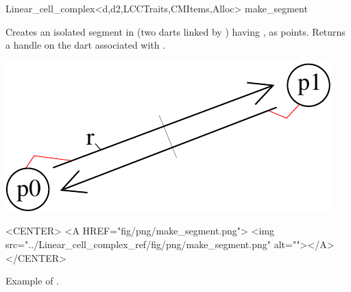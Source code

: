 \begin{ccRefClass}{Linear_cell_complex<d,d2,LCCTraits,CMItems,Alloc>}
{make_segment}{}

{Creates an isolated segment in  (two darts linked by \betadeux{}) 
  having ,  as points.
  Returns a handle on the dart associated with .
}
% 
\def\LargFig{.3\textwidth}
\begin{ccTexOnly}
  \begin{center}
    \includegraphics[width=\LargFig]{Linear_cell_complex_ref/fig/pdf/make_segment}
  \end{center}
\end{ccTexOnly}
\begin{ccHtmlOnly}
  <CENTER>
  <A HREF="fig/png/make_segment.png">
  <img src="../Linear_cell_complex_ref/fig/png/make_segment.png" alt=""></A>
  </CENTER>
\end{ccHtmlOnly}
\centerline{Example of .}


\end{ccRefClass}

